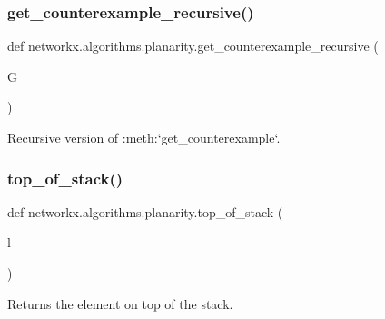 \subsubsection{\texorpdfstring{get\+\_\+counterexample\+\_\+recursive()}{get\_counterexample\_recursive()}}
{\footnotesize\ttfamily def networkx.\+algorithms.\+planarity.\+get\+\_\+counterexample\+\_\+recursive (\begin{DoxyParamCaption}\item[{}]{G }\end{DoxyParamCaption})}

\begin{DoxyVerb}Recursive version of :meth:`get_counterexample`.\end{DoxyVerb}
 \mbox{\label{namespacenetworkx_1_1algorithms_1_1planarity_ad9d14e1fb52877b3f48cb8b3cc6dd3d6}} 
\subsubsection{\texorpdfstring{top\+\_\+of\+\_\+stack()}{top\_of\_stack()}}
{\footnotesize\ttfamily def networkx.\+algorithms.\+planarity.\+top\+\_\+of\+\_\+stack (\begin{DoxyParamCaption}\item[{}]{l }\end{DoxyParamCaption})}

\begin{DoxyVerb}Returns the element on top of the stack.\end{DoxyVerb}
 
